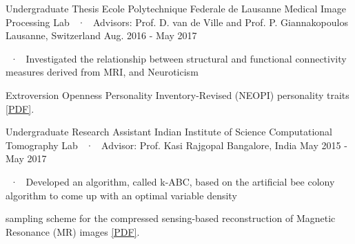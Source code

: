 \begin{cventries}
  \cventryLab
    {Undergraduate Thesis} %
    {Ecole Polytechnique Federale de Lausanne} %
    {Medical Image Processing Lab ~·~ Advisors: Prof. D. van de Ville and Prof. P. Giannakopoulos} %
    {Lausanne, Switzerland} %
    {Aug. 2016 - May 2017} %
    { %
      \begin{cvitems}
		\item ~·~ Investigated the relationship between structural and functional connectivity measures derived from MRI, and Neuroticism 
         \item \phantom{~·~} Extroversion Openness Personality Inventory-Revised (NEOPI) personality traits \href{https://doi.org/10.3389/fpsyg.2018.02652}{[PDF]}.
      \end{cvitems}
    }

  \cventryLab
    {Undergraduate Research Assistant} %
    {Indian Institute of Science} %
    {Computational Tomography Lab ~·~ Advisor: Prof. Kasi Rajgopal} %
    {Bangalore, India} %
    {May 2015 - May 2017} %
    { %
      \begin{cvitems}
      \item ~·~ Developed an algorithm, called k-ABC, based on the artificial bee colony algorithm to come up with an optimal variable density 
      \item \phantom{~·~} sampling scheme for the compressed sensing-based reconstruction of Magnetic Resonance (MR) images \href{https://doi.org/10.1109/TENCON.2016.7848212}{[PDF]}.
      \end{cvitems}
    }


\end{cventries}

